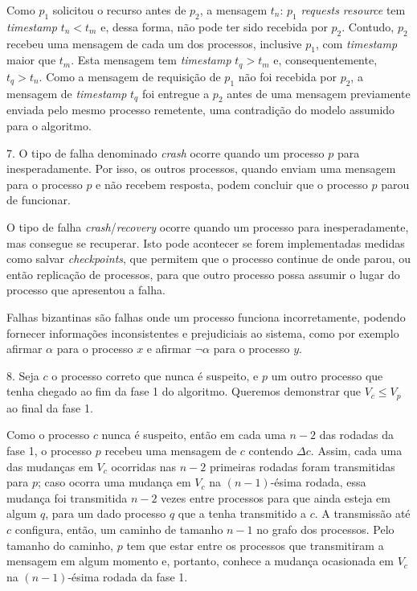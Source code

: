 \documentclass[a4paper]{article}
\begin{document}
Como $p_1$ solicitou o recurso antes de $p_2$, a mensagem $t_n$: $p_1$ \textit{requests resource} tem \textit{timestamp} $t_n < t_m$ e, dessa forma, não pode ter sido recebida por $p_2$.
Contudo, $p_2$ recebeu uma mensagem de cada um dos processos, inclusive $p_1$, com \textit{timestamp} maior que $t_m$.
Esta mensagem tem \textit{timestamp} $t_q > t_m$ e, consequentemente, $t_q > t_n$.
Como a mensagem de requisição de $p_1$ não foi recebida por $p_2$, a mensagem de \textit{timestamp} $t_q$ foi entregue a $p_2$ antes de uma mensagem previamente enviada pelo mesmo processo remetente, uma contradição do modelo assumido para o algoritmo.

\bigskip

7. O tipo de falha denominado \textit{crash} ocorre quando um processo $p$ para inesperadamente.
Por isso, os outros processos, quando enviam uma mensagem para o processo $p$ e não recebem resposta, podem concluir que o processo $p$ parou de funcionar.

O tipo de falha \textit{crash}/\textit{recovery} ocorre quando um processo para inesperadamente, mas consegue se recuperar.
Isto pode acontecer se forem implementadas medidas como salvar \textit{checkpoints}, que permitem que o processo continue de onde parou, ou então replicação de processos, para que outro processo possa assumir o lugar do processo que apresentou a falha.

Falhas bizantinas são falhas onde um processo funciona incorretamente, podendo fornecer informações inconsistentes e prejudiciais ao sistema, como por exemplo afirmar $\alpha$ para o processo $x$ e afirmar $\lnot\alpha$ para o processo $y$.

\bigskip

8. Seja $c$ o processo correto que nunca é suspeito, e $p$ um outro processo que tenha chegado ao fim da fase 1 do algoritmo.
Queremos demonstrar que $V_c \leq V_p$ ao final da fase 1.

Como o processo $c$ nunca é suspeito, então em cada uma $n - 2$ das rodadas da fase 1, o processo $p$ recebeu uma mensagem de $c$ contendo $\Delta c$.
Assim, cada uma das mudanças em $V_c$ ocorridas nas $n - 2$ primeiras rodadas foram transmitidas para $p$; caso ocorra uma mudança em $V_c$ na $(n - 1)$-ésima rodada, essa mudança foi transmitida $n - 2$ vezes entre processos para que ainda esteja em algum $q$, para um dado processo $q$ que a tenha transmitido a $c$.
A transmissão até $c$ configura, então, um caminho de tamanho $n - 1$ no grafo dos processos.
Pelo tamanho do caminho, $p$ tem que estar entre os processos que transmitiram a mensagem em algum momento e, portanto, conhece a mudança ocasionada em $V_c$ na $(n - 1)$-ésima rodada da fase 1.
\end{document}
